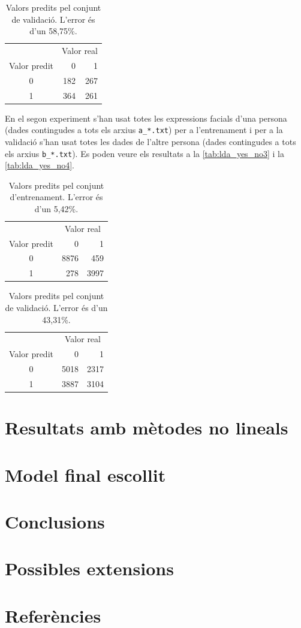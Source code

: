 \documentclass[a4paper]{article}
\begin{document}
\begin{table}[H]
	\centering
	\def\arraystretch{1.5}
	\begin{tabular}{c|rr}
		& \multicolumn{2}{c}{Valor real} \\
		Valor predit & 0 & 1 \\
		\hline
		0 & 182 & 267 \\
		1 & 364 & 261 \\
	\end{tabular}
	\caption{Valors predits pel conjunt de validació. L'error és d'un 58,75\%.}
	\label{tab:lda_yes_no2}
\end{table}

En el segon experiment s'han usat totes les expressions facials d'una persona (dades contingudes a tots els arxius \verb|a_*.txt|) per a l'entrenament i per a la validació s'han usat totes les dades de l'altre persona (dades contingudes a tots els arxius \verb|b_*.txt|). Es poden veure els resultats a la \autoref{tab:lda_yes_no3} i la 	\autoref{tab:lda_yes_no4}.

\begin{table}[H]
	\centering
	\def\arraystretch{1.5}
	\begin{tabular}{c|rr}
		& \multicolumn{2}{c}{Valor real} \\
		Valor predit & 0 & 1 \\
		\hline
		0 & 8876 & 459 \\
		1 & 278 & 3997 \\
	\end{tabular}
	\caption{Valors predits pel conjunt d'entrenament. L'error és d'un 5,42\%.}
	\label{tab:lda_yes_no3}
\end{table}

\begin{table}[H]
	\centering
	\def\arraystretch{1.5}
	\begin{tabular}{c|rr}
		& \multicolumn{2}{c}{Valor real} \\
		Valor predit & 0 & 1 \\
		\hline
		0 & 5018 & 2317 \\
		1 & 3887 & 3104 \\
	\end{tabular}
	\caption{Valors predits pel conjunt de validació. L'error és d'un 43,31\%.}
	\label{tab:lda_yes_no4}
\end{table}

\section{Resultats amb mètodes no lineals}
\section{Model final escollit}
\section{Conclusions}
\section{Possibles extensions}
\section{Referències}



\end{document}
